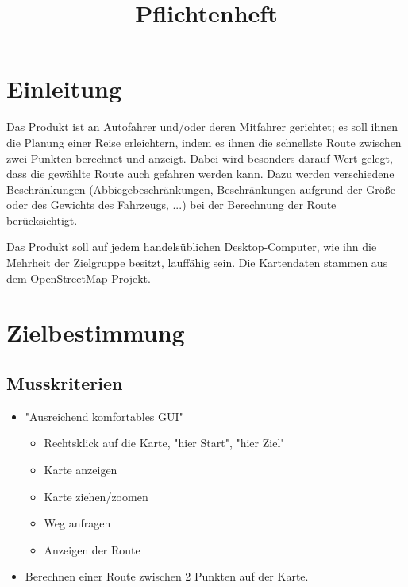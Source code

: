 \documentclass[a4paper, 11pt]{article}
\title{Pflichtenheft}
\begin{document}

\newcommand{\refsymbol}[0]{\scalebox{0.5}{$\nearrow$}}
\let\oldref\ref
\renewcommand{\ref}[1]{\refsymbol\oldref{#1}}
\let\oldgls\gls
\renewcommand{\gls}[1]{\refsymbol\oldgls{#1}}

\maketitle
\newpage
\tableofcontents
\newpage
\section{Einleitung}
Das Produkt ist an Autofahrer und/oder deren Mitfahrer gerichtet; es soll ihnen die Planung einer Reise erleichtern, indem es ihnen die schnellste Route zwischen zwei Punkten berechnet und anzeigt.
Dabei wird besonders darauf Wert gelegt, dass die gewählte Route auch gefahren werden kann. Dazu werden verschiedene Beschränkungen (Abbiegebeschränkungen, Beschränkungen aufgrund der Größe oder des Gewichts des Fahrzeugs, ...) bei der Berechnung der Route berücksichtigt.

Das Produkt soll auf jedem handelsüblichen Desktop-Computer, wie ihn die Mehrheit der Zielgruppe besitzt, lauffähig sein. Die Kartendaten stammen aus dem OpenStreetMap-Projekt.

\section{Zielbestimmung}

\subsection{Musskriterien}
\begin{itemize}
\item "Ausreichend komfortables GUI"
\begin{itemize}
\item Rechtsklick auf die Karte, "hier Start", "hier Ziel" %
\item Karte anzeigen
\item Karte ziehen/zoomen
\item Weg anfragen
\item Anzeigen der Route
\end{itemize}
\item Berechnen einer Route zwischen 2 Punkten auf der Karte.
\end{itemize}
\end{document}
